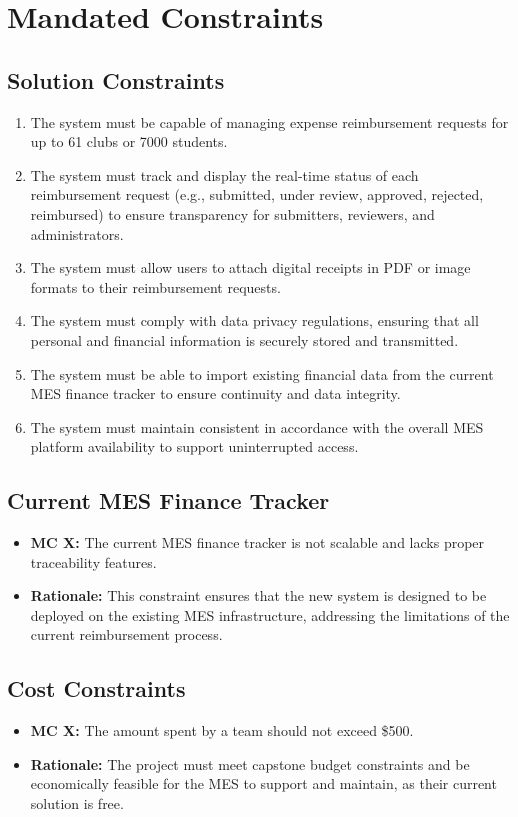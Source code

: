 \documentclass[12pt]{article}
\begin{document}
\section{Mandated Constraints}


\subsection{Solution Constraints}
  \begin{enumerate}
    \item The system must be capable of managing expense reimbursement requests for up to 61 clubs or 7000 students.
    \item The system must track and display the real-time status of each reimbursement request (e.g., submitted, under review, approved, rejected, reimbursed) to ensure transparency for submitters, reviewers, and administrators.
    \item The system must allow users to attach digital receipts in PDF or image formats to their reimbursement requests.
    \item The system must comply with data privacy regulations, ensuring that all personal and financial information is securely stored and transmitted.
    \item The system must be able to import existing financial data from the current MES finance tracker to ensure continuity and data integrity.
    \item The system must maintain consistent in accordance with the overall MES platform availability to support uninterrupted access.
  \end{enumerate}

\subsection{Current MES Finance Tracker}
  \begin{itemize}
    \item \textbf{MC X:} The current MES finance tracker is not scalable and lacks proper traceability features.
    \item \textbf{Rationale:} This constraint ensures that the new system is designed to be deployed on the existing MES infrastructure, addressing the limitations of the current reimbursement process.
  \end{itemize}

\subsection{Cost Constraints}
  \begin{itemize}
    \item \textbf{MC X:} The amount spent by a team should not exceed \$500.
    \item \textbf{Rationale:} The project must meet capstone budget constraints and be economically feasible for the MES to support and maintain, as their current solution is free.
  \end{itemize}
\end{document}
